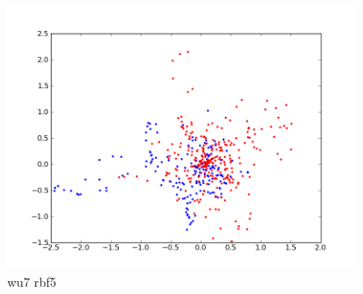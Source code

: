 \begin{figure}[here]
	\center
	\caption{wu7 rbf5}
	\label{fig:wu7_rbf5}
	\includegraphics[width=4.0in]{img/wu7_rbf5.png}
\end{figure}